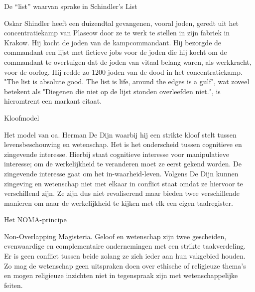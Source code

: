 \documentclass[main.tex]{subfiles}
\begin{document}
\begin{examenvraag}
    \begin{vraag}
        De “list” waarvan sprake in Schindler’s List
    \end{vraag}

    \begin{antwoord}
        Oskar Shindler heeft een duizendtal gevangenen, vooral joden, geredt uit het concentratiekamp van Plaseow door ze te werk te stellen in zijn fabriek in Krakow.
        Hij kocht de joden van de kampcommandant.
        Hij bezorgde de commandant een lijst met fictieve jobs voor de joden die hij kocht om de commandant te overtuigen dat de joden van vitaal belang waren, als werkkracht, voor de oorlog.
        Hij redde zo 1200 joden van de dood in het concentratiekamp.
        "The list is absolute good. The list is life, around the edges is a gulf", wat zoveel betekent als "Diegenen die niet op de lijst stonden overleefden niet.", is hieromtrent een markant citaat.
    \end{antwoord}
\end{examenvraag}


\begin{examenvraag}
    \begin{vraag}
        Kloofmodel
    \end{vraag}

    \begin{antwoord}
        Het model van oa.‭ ‬Herman De Dijn‭ ‬waarbij hij een strikte kloof stelt tussen levensbeschouwing 
        en wetenschap.‭ ‬Het is het onderscheid tussen cognitieve en zingevende interesse.‭ ‬Hierbij staat 
        cognitieve interesse voor manipulatieve interesse‭; ‬om de werkelijkheid te veranderen moet ze 
        eerst‭ ‬gekend worden.‭ ‬De zingevende interesse gaat om het in-waarheid-leven.‭ ‬Volgens De Dijn 
        kunnen zingeving en wetenschap niet met elkaar in conflict staat omdat ze hiervoor te 
        verschillend zijn.‭ ‬Ze zijn dus niet revaliserend maar bieden twee verschillende manieren om 
        naar de werkelijkheid te kijken met elk een eigen taalregister.
    \end{antwoord}
\end{examenvraag}


\begin{examenvraag}
    \begin{vraag}
        Het NOMA-principe
    \end{vraag}

    \begin{antwoord}
        Non-Overlapping Magisteria.‭ ‬Geloof en wetenschap zijn twee gescheiden,‭ ‬evenwaardige en 
        complementaire ondernemingen met een strikte taakverdeling.‭ ‬Er is geen conflict tussen beide 
        zolang ze zich ieder aan hun vakgebied houden.‭ ‬Zo mag de wetenschap geen uitspraken doen over 
        ethische of religieuze thema‭’‬s en mogen religieuze inzichten niet in tegenspraak zijn met 
        wetenschappelijke feiten.
    \end{antwoord}
\end{examenvraag}
\end{document}
